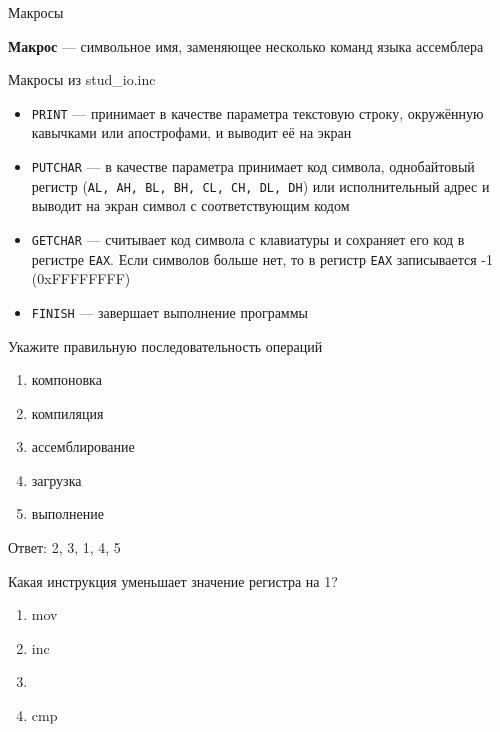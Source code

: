 \documentclass{beamer}
\begin{document}
    \begin{frame}{Макросы}

    {\bf Макрос} --- символьное имя, заменяющее несколько команд языка ассемблера

    \begin{block}{Макросы из stud\_io.inc}
        \begin{itemize}
            \item {\tt PRINT} --- принимает в качестве параметра текстовую строку, окружённую кавычками или апострофами, и выводит её на экран
            \item {\tt PUTCHAR} --- в качестве параметра принимает код символа, однобайтовый регистр ({\tt AL, AH, BL, BH, CL, CH, DL, DH}) или исполнительный адрес и выводит на экран символ с соответствующим кодом
            \item {\tt GETCHAR} --- считывает код символа с клавиатуры и сохраняет его код в регистре {\tt EAX}. Если символов больше нет, то в регистр {\tt EAX} записывается -1 (0xFFFFFFFF)
            \item {\tt FINISH} --- завершает выполнение программы
        \end{itemize}
    \end{block}
    \end{frame}
    \begin{frame}
    \begin{block}{Укажите правильную последовательность операций}
        \begin{enumerate}
            \item компоновка
            \item компиляция
            \item ассемблирование
            \item загрузка
            \item выполнение
        \end{enumerate}
        \pause
        Ответ: 2, 3, 1, 4, 5
    \end{block}
    \pause
    \begin{block}{Какая инструкция уменьшает значение регистра на 1?}
        \begin{enumerate}
            \item mov
            \item inc
            \item {}
            \item cmp
        \end{enumerate}
    \end{block}
    \end{frame}
\end{document}
